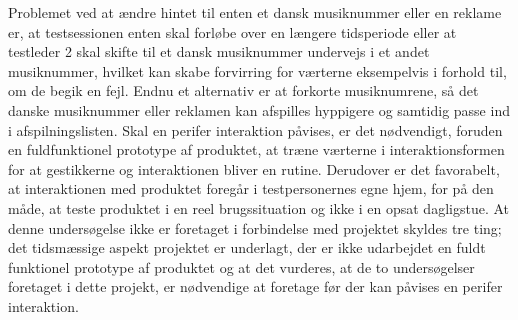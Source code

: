 Problemet ved at ændre hintet til enten et dansk musiknummer eller en reklame er, at testsessionen enten skal forløbe over en længere tidsperiode eller at testleder 2 skal skifte til et dansk musiknummer undervejs i et andet musiknummer, hvilket kan skabe forvirring for værterne eksempelvis i forhold til, om de begik en fejl. Endnu et alternativ er at forkorte musiknumrene, så det danske musiknummer eller reklamen kan afspilles hyppigere og samtidig passe ind i afspilningslisten.\blankline
%
Skal en perifer interaktion påvises, er det nødvendigt, foruden en fuldfunktionel prototype af produktet, at træne værterne i interaktionsformen for at gestikkerne og interaktionen bliver en rutine. Derudover er det favorabelt, at interaktionen med produktet foregår i testpersonernes egne hjem, for på den måde, at teste produktet i en reel brugssituation og ikke i en opsat dagligstue. At denne undersøgelse ikke er foretaget i forbindelse med projektet skyldes tre ting; det tidsmæssige aspekt projektet er underlagt, der er ikke udarbejdet en fuldt funktionel prototype af produktet og at det vurderes, at de to undersøgelser foretaget i dette projekt, er nødvendige at foretage før der kan påvises en perifer interaktion.     
% 